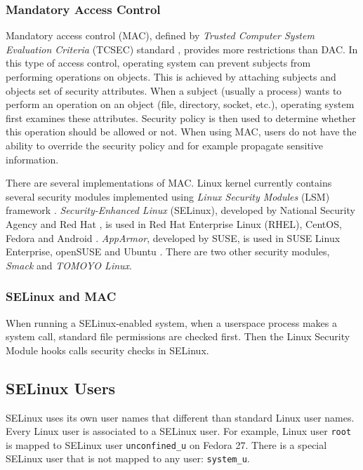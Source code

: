 \subsubsection{Mandatory Access Control}
Mandatory access control (MAC), defined by \emph{Trusted Computer System
Evaluation Criteria} (TCSEC) standard \cite{orangebook}, provides more
restrictions than DAC. In this type of access control, operating system can
prevent subjects from performing operations on objects. This is achieved by
attaching subjects and objects set of security attributes. When a subject
(usually a process) wants to perform an operation on an object (file, directory,
socket, etc.), operating system first examines these attributes. Security policy
is then used to determine whether this operation should be allowed or not. When
using MAC, users do not have the ability to override the security policy and
for example propagate sensitive information.

There are several implementations of MAC. Linux kernel currently contains
several security modules implemented using \emph{Linux Security Modules} (LSM)
framework \cite{lsmusage}. \emph{Security-Enhanced Linux} (SELinux), developed
by National Security Agency and Red Hat \cite{selinuxcontr}, is used in Red Hat
Enterprise Linux (RHEL), CentOS, Fedora and Android
\cite{selinuxguide,selinuxguidefedora,selinuxandroid}. \emph{AppArmor},
developed by SUSE, is used in SUSE Linux Enterprise, openSUSE and Ubuntu
\cite{apparmor,apparmorubuntu}. There are two other security modules,
\emph{Smack} and \emph{TOMOYO Linux}.

\subsubsection{SELinux and MAC}
When running a SELinux-enabled system, when a userspace process makes a system
call, standard file permissions are checked first. Then the Linux Security
Module hooks calls security checks in SELinux.

\subsection{SELinux Users}
\label{selinuxuser}
SELinux uses its own user names that different than standard Linux user names.
Every Linux user is associated to a SELinux user. For example, Linux user
\texttt{root} is mapped to SELinux user \texttt{unconfined\_u} on Fedora 27.
There is a special SELinux user that is not mapped to any user:
\texttt{system\_u}.

